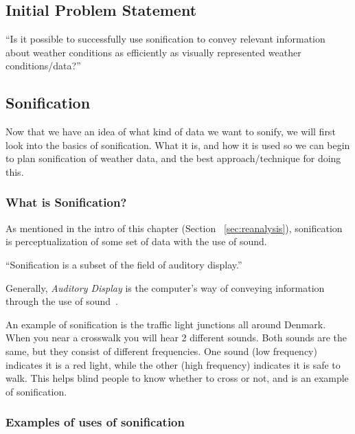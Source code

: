\subsection{Initial Problem Statement} %
\label{sub:initial_problem_statement}

\enquote{Is it possible to successfully use sonification to convey relevant information about weather conditions as efficiently as visually represented weather conditions/data?}



\subsection{Sonification} %
\label{sub:sonification}

Now that we have an idea of what kind of data we want to sonify, we will first look into the basics of sonification. What it is, and how it is used so we can begin to plan sonification of weather data, and the best approach/technique for doing this.


\subsubsection{What is Sonification?} %
\label{ssub:what_is_sonification_}


As mentioned in the intro of this chapter (Section ~\ref{sec:reanalysis}), sonification is perceptualization of some set of data with the use of sound. 

\enquote{Sonification is a subset of the field of auditory display.}~\cite*{Walker2006}

Generally, \emph{Auditory Display} is the computer’s way of conveying information through the use of sound~\cite*{Wiki2014-3}.

An example of sonification is the traffic light junctions all around Denmark. 
When you near a crosswalk you will hear 2 different sounds. 
Both sounds are the same, but they consist of different frequencies. 
One sound (low frequency) indicates it is a red light, while the other (high frequency) indicates it is safe to walk. 
This helps blind people to know whether to cross or not, and is an example of sonification.





\subsubsection{Examples of uses of sonification} %
\label{ssub:examples_of_sonification}

